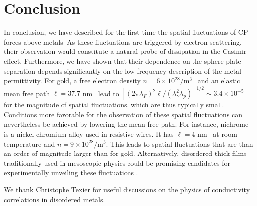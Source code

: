 \documentclass[doublecol]{epl2}
\begin{document}
\section{Conclusion} 

In conclusion, we have described for the first time the spatial fluctuations of CP forces above metals. As these fluctuations are triggered by electron scattering, their observation would constitute a natural probe of dissipation in the Casimir effect. Furthermore, we have shown that their dependence on the sphere-plate separation depends significantly on the low-frequency description of the metal permittivity. For gold, a free electron density $n=6 \times 10^{28} / \text{m}^3$~\cite{AshcroftMermin} and an elastic mean free path $\ell = 37.7$ nm~\cite{Gall2016} lead to $[(2\pi\lambda_F)^2\ell/(\lambda_\gamma^2\lambda_p)]^{1/2}\sim 3.4 \times 10^{-5}$ for the magnitude of spatial fluctuations, which are thus typically small.  Conditions more favorable for the observation of these spatial fluctuations can nevertheless be achieved by lowering  the mean free path. For instance, nichrome is a nickel-chromium alloy used in resistive wires. It has $\ell = 4$ nm~\cite{Davidson1976} at room temperature and $n = 9 \times 10^{28} / \text{m}^3$. This leads to spatial fluctuations that are than an order of magnitude larger than for gold. Alternatively, disordered thick films traditionally used in mesoscopic physics could be promising candidates for experimentally unveiling these fluctuations \cite{Lee85}.

\acknowledgments
We thank Christophe Texier for useful discussions on the physics of conductivity correlations in
disordered metals.
\end{document}
